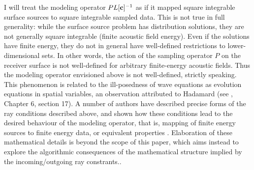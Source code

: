 \documentclass[12pt]{geophysics}
\begin{document}
I will treat the modeling operator $PL[{\bf c}]^{-1}$ as if
it mapped square integrable surface sources to square integrable sampled
data. This is not true in full generality: while the surface source
problem has distribution solutions, they are not generally square
integrable (finite acoustic field energy). Even if the solutions have
finite energy, they do not in general have well-defined
restrictions to lower-dimensional sets. In other words, the action of
the sampling
operator $P$ on the receiver surface is not well-defined for arbitrary
finite-energy acoustic fields. Thus the modeling operator envisioned above
is not well-defined, strictly speaking.
This phenomenon is related to the ill-posedness of wave equations as
evolution equations in spatial variables, an observation attributed to
Hadamard (see \cite{CourHil:62}, Chapter 6, section 17). A number of
authors have described precise forms of the ray conditions described
above, and shown how these conditions lead to the desired behaviour of
the modeling operator, that is, mapping of finite energy sources to
finite energy data, or equivalent properties
\cite[]{Payn:75,Symes:83,Lasi:86,LasLionsTrig:86,Lasi:87, BaoSy:91b}.
Elaboration of these mathematical details is beyond the scope of this
paper, which aims instead to explore the algorithmic consequences of
the mathematical structure implied by the incoming/outgoing ray constrants..


\end{document}
